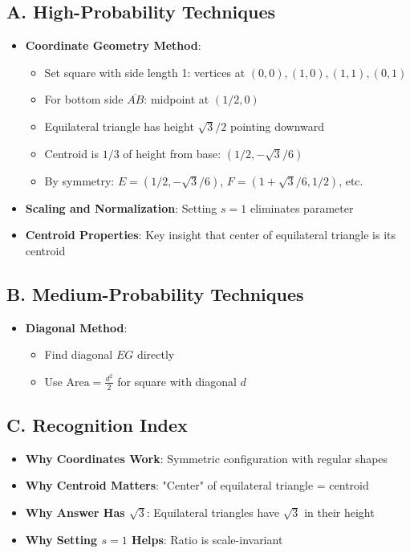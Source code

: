 \documentclass[]{article}
\begin{document}
\begin{techniquesbox}
\subsection*{A. High-Probability Techniques}
\begin{itemize}[leftmargin=*]
    \item \textbf{Coordinate Geometry Method}: 
    \begin{itemize}
        \item Set square with side length 1: vertices at $(0,0), (1,0), (1,1), (0,1)$
        \item For bottom side $\overline{AB}$: midpoint at $(1/2, 0)$
        \item Equilateral triangle has height $\sqrt{3}/2$ pointing downward
        \item Centroid is $1/3$ of height from base: $(1/2, -\sqrt{3}/6)$
        \item By symmetry: $E = (1/2, -\sqrt{3}/6)$, $F = (1+\sqrt{3}/6, 1/2)$, etc.
    \end{itemize}
    \item \textbf{Scaling and Normalization}: Setting $s=1$ eliminates parameter
    \item \textbf{Centroid Properties}: Key insight that center of equilateral triangle is its centroid
\end{itemize}

\subsection*{B. Medium-Probability Techniques}
\begin{itemize}[leftmargin=*]
    \item \textbf{Diagonal Method}: 
    \begin{itemize}
        \item Find diagonal $EG$ directly
        \item Use $\text{Area} = \frac{d^2}{2}$ for square with diagonal $d$
    \end{itemize}
\end{itemize}

\subsection*{C. Recognition Index}
\begin{itemize}[leftmargin=*]
    \item \textbf{Why Coordinates Work}: Symmetric configuration with regular shapes
    \item \textbf{Why Centroid Matters}: "Center" of equilateral triangle = centroid
    \item \textbf{Why Answer Has $\sqrt{3}$}: Equilateral triangles have $\sqrt{3}$ in their height
    \item \textbf{Why Setting $s=1$ Helps}: Ratio is scale-invariant
\end{itemize}


\end{techniquesbox}
\end{document}
